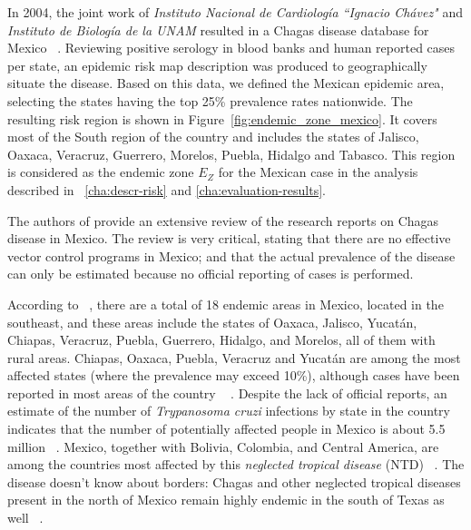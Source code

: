 In 2004, the joint work of \textit{Instituto Nacional de Cardiología ``Ignacio Chávez"} and  \textit{Instituto de Biología de la UNAM} resulted in a Chagas disease database for Mexico~ \textcite{cruz2006chagmex}. Reviewing positive serology in blood banks and human reported cases per state, an epidemic risk map description was produced to geographically situate the disease. Based on this data, we defined the Mexican epidemic area, selecting the states having the top 25\% prevalence rates nationwide. The resulting risk region is shown in Figure~\cref{fig:endemic_zone_mexico}. It covers most of the South region of the country and includes the states of Jalisco, Oaxaca, Veracruz, Guerrero, Morelos, Puebla, Hidalgo and Tabasco.
This region is considered as the endemic zone $E_Z$ for the Mexican case in the analysis described in ~\cref{cha:descr-risk} and \cref{cha:evaluation-results}.



The authors of  \textcite{carabarin2013chagas} provide an extensive review of the
research reports on Chagas disease in Mexico.
The review is very critical, stating that there are no effective vector control programs in Mexico;
and that the actual prevalence of the disease
can only be estimated because no official reporting of cases is performed.

According to~  \textcite{dumonteil1999update},
there are a total of 18 endemic areas in Mexico, located in the southeast, and
these areas include the states of Oaxaca, Jalisco, Yucatán, Chiapas, Veracruz,
Puebla, Guerrero, Hidalgo, and Morelos, all of them with rural areas.
Chiapas, Oaxaca, Puebla, Veracruz and Yucatán are among the most affected states (where the prevalence may exceed 10\%), although cases have been reported in most areas of the country
~ \textcite{cruz2006chagmex,dumonteil1999update}.
Despite the lack of official reports, an estimate of the number of \textit{Trypanosoma cruzi} infections by state in the country
indicates that the number of potentially
affected people in Mexico is about 5.5 million~ \textcite{carabarin2013chagas}.
Mexico, together with Bolivia, Colombia, and Central
America, are among the countries most affected by this
\textit{neglected tropical disease} (NTD)~ \textcite{hotez2013innovation}.
The disease doesn't know about borders:
Chagas and other neglected tropical diseases present in the north of Mexico remain highly endemic in the south of Texas as well~ \textcite{hotez2012texas}.

